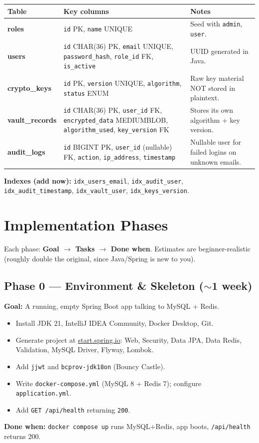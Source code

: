 \documentclass[11pt,a4paper]{article}
\newcommand{\code}[1]{\texttt{#1}}
\begin{document}
\renewcommand{\arraystretch}{1.3}
\begin{longtable}{>{\bfseries}p{2.4cm} p{5.5cm} p{5.5cm}}
\hline
\textbf{Table} & \textbf{Key columns} & \textbf{Notes} \\ \hline
roles & \code{id} PK, \code{name} UNIQUE & Seed with \code{admin}, \code{user}. \\ \hline
users & \code{id} CHAR(36) PK, \code{email} UNIQUE, \code{password\_hash}, \code{role\_id} FK, \code{is\_active} & UUID generated in Java. \\ \hline
crypto\_keys & \code{id} PK, \code{version} UNIQUE, \code{algorithm}, \code{status} ENUM & Raw key material NOT stored in plaintext. \\ \hline
vault\_records & \code{id} CHAR(36) PK, \code{user\_id} FK, \code{encrypted\_data} MEDIUMBLOB, \code{algorithm\_used}, \code{key\_version} FK & Stores its own algorithm + key version. \\ \hline
audit\_logs & \code{id} BIGINT PK, \code{user\_id} (nullable) FK, \code{action}, \code{ip\_address}, \code{timestamp} & Nullable user for failed logins on unknown emails. \\ \hline
\end{longtable}
\textbf{Indexes (add now):} \code{idx\_users\_email}, \code{idx\_audit\_user},
\code{idx\_audit\_timestamp}, \code{idx\_vault\_user}, \code{idx\_keys\_version}.

\section{Implementation Phases}
Each phase: \textbf{Goal $\to$ Tasks $\to$ Done when}. Estimates are beginner-realistic
(roughly double the original, since Java/Spring is new to you).

\subsection{Phase 0 — Environment \& Skeleton ($\sim$1 week)}
\textbf{Goal:} A running, empty Spring Boot app talking to MySQL + Redis.
\begin{itemize}[leftmargin=*]
  \item Install JDK 21, IntelliJ IDEA Community, Docker Desktop, Git.
  \item Generate project at \href{https://start.spring.io}{start.spring.io}: Web, Security, Data JPA, Data Redis, Validation, MySQL Driver, Flyway, Lombok.
  \item Add \code{jjwt} and \code{bcprov-jdk18on} (Bouncy Castle).
  \item Write \code{docker-compose.yml} (MySQL 8 + Redis 7); configure \code{application.yml}.
  \item Add \code{GET /api/health} returning \code{200}.
\end{itemize}
\textbf{Done when:} \code{docker compose up} runs MySQL+Redis, app boots, \code{/api/health} returns 200.
\end{document}

